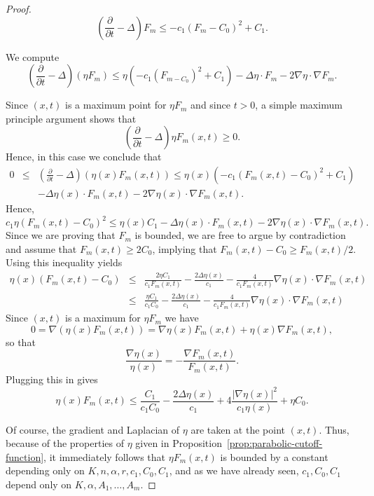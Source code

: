 \begin{proof}
\[
\left(  \frac{\partial}{\partial t}-\Delta\right)
F_{m}\leq-c_1\left( F_{m}-C_0\right)  ^{2}+C_1.
\]

We compute
\[
\left(  \frac{\partial}{\partial t}-\Delta\right)  \left(  \eta
F_{m}\right) \leq\eta\left(  -c_1\left(
F_{m-C_0}\right)^{2}+C_1\right) -\Delta\eta\cdot
F_m-2\nabla\eta\cdot\nabla F_m.
\]


 Since $(x,t)$ is a maximum point for $\eta F_m$ and since
$t>0$,  a simple maximum principle argument shows that
$$\left(  \frac{\partial}{\partial t}-\Delta\right)\eta  F_{m}(x,t)\ge 0.$$
Hence, in this case we conclude that
\begin{eqnarray*} 0& \le & \left(
\frac{\partial}{\partial t}-\Delta\right)  \left( \eta(x)
F_{m}(x,t)\right) \leq\eta(x)\left(  -c_1\left(
F_{m}(x,t)-C_0\right)^{2}+C_1\right) \\
& &  -\Delta\eta(x)\cdot F_m(x,t)-2\nabla\eta(x)\cdot\nabla
F_m(x,t). \end{eqnarray*}
 Hence, $$c_1\eta (F_m(x,t)-C_0)^2\le \eta(x)
C_1-\Delta\eta(x)\cdot F_m(x,t)-2\nabla\eta(x)\cdot \nabla F_m(x,t).$$ Since we
are proving that $F_m$ is bounded, we are free to argue by contradiction and
assume that $F_m(x,t)\ge 2C_0$, implying that $F_m(x,t)-C_0\ge F_m(x,t)/2$.
Using this inequality yields \begin{eqnarray*} \eta(x) (F_m(x,t)-C_0) & \le &
\frac{2\eta C_1}{c_1F_m(x,t)}-\frac{2\Delta\eta(x)}{c_1} -\frac{4}{c_1F_m(x,t)}
\nabla\eta(x)\cdot\nabla F_m(x,t) \\
&\le &  \frac{\eta C_1}{c_1C_0}-\frac{2\Delta\eta(x)}{c_1}
-\frac{4}{c_1F_m(x,t)} \nabla\eta(x)\cdot\nabla F_m(x,t)\end{eqnarray*}
Since
$(x,t)$ is a maximum for $\eta F_m$ we have
$$0=\nabla(\eta(x) F_m(x,t))=\nabla\eta(x) F_m(x,t)+\eta(x)\nabla F_m(x,t),$$
so that
$$\frac{\nabla\eta(x)}{\eta(x)}=-\frac{\nabla F_m(x,t)}{F_m(x,t)}.$$
Plugging this in gives
$$\eta(x) F_m(x,t)\le
\frac{C_1}{c_1C_0}-\frac{2\Delta\eta(x)}{c_1}+4\frac{|\nabla\eta(x)|^2}{c_1\eta(x)}+\eta
C_0.$$

Of course, the gradient and Laplacian of $\eta$ are taken at the
point $(x,t)$.  Thus, because of the properties of $\eta$ given in
Proposition~\ref{prop:parabolic-cutoff-function}, it immediately follows that $\eta F_m(x,t)$ is
bounded by a constant depending
 only on $K,n,\alpha,r,c_1,C_0,C_1$, and as we have already seen, $c_1,C_0,C_1$ depend only on
 $K,\alpha,A_1,\ldots,A_m$.


\end{proof}
